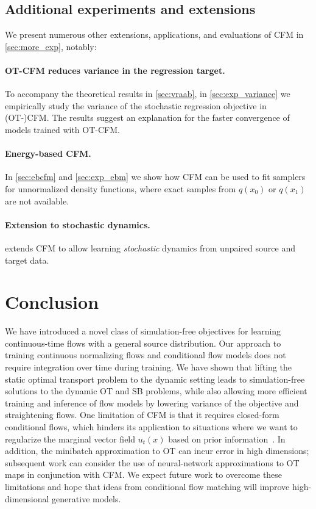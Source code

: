 \documentclass[10pt]{article}
\theoremstyle{plain}
\theoremstyle{definition}
\theoremstyle{remark}
\begin{document}
\subsection{Additional experiments and extensions}

We present numerous other extensions, applications, and evaluations of CFM in \autoref{sec:more_exp}, notably:

\paragraph{OT-CFM reduces variance in the regression target.} To accompany the theoretical results in \autoref{sec:vraab}, in \autoref{sec:exp_variance} we empirically study the variance of the stochastic regression objective in (OT-)CFM. The results suggest an explanation for the faster convergence of models trained with OT-CFM.

\paragraph{Energy-based CFM.} In \autoref{sec:ebcfm} and \autoref{sec:exp_ebm} we show how CFM can be used to fit samplers for unnormalized density functions, where exact samples from $q(x_0)$ or $q(x_1)$ are not available.

\paragraph{Extension to stochastic dynamics.} \citet{singlecell} extends CFM to allow learning \emph{stochastic} dynamics from unpaired source and target data.

\section{Conclusion}

We have introduced a novel class of simulation-free objectives for learning continuous-time flows with a general source distribution. Our approach to training continuous normalizing flows and conditional flow models does not require integration over time during training. We have shown that lifting the static optimal transport problem to the dynamic setting leads to simulation-free solutions to the dynamic OT and SB problems, while also allowing more efficient training and inference of flow models by lowering variance of the objective and straightening flows. 
One limitation of CFM is that it requires closed-form conditional flows, which hinders its application to situations where we want to regularize the marginal vector field $u_t(x)$ based on prior information~\citep{tong_trajectorynet_2020}. In addition, the minibatch approximation to OT can incur error in high dimensions; subsequent work can consider the use of neural-network approximations to OT maps \citep{neural_ot,kernel_neural_ot} in conjunction with CFM. We expect future work to overcome these limitations and hope that ideas from conditional flow matching will improve high-dimensional generative models. 
%
\end{document}
